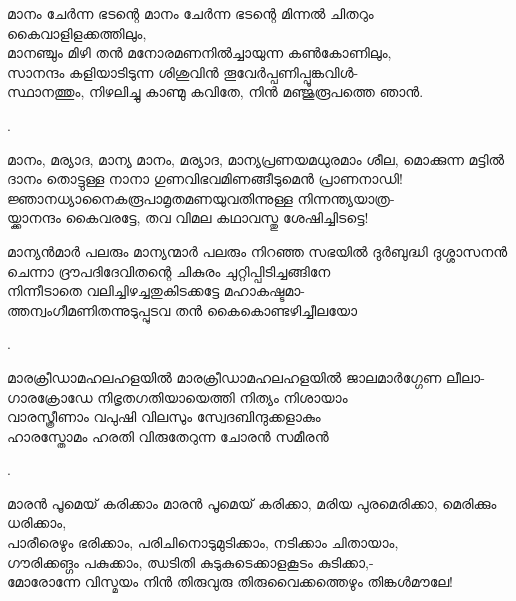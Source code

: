 \begin{enumerate}

\begin{slokam}{\VSv}{\VNM}{മാനം ചേർന്ന ഭടന്റെ}
മാനം ചേർന്ന ഭടന്റെ മിന്നൽ ചിതറും കൈവാളിളക്കത്തിലും,\\
മാനഞ്ചും മിഴി തൻ മനോരമണനിൽച്ചായുന്ന കൺകോണിലും,\\
സാനന്ദം കളിയാടിടുന്ന ശിശുവിൻ തൂവേർപ്പണിപ്പൂങ്കവിള്‍-\\
സ്ഥാനത്തും, നിഴലിച്ചു കാണ്മു കവിതേ, നിൻ മഞ്ജുരൂപത്തെ ഞാൻ.
\end{slokam}


.

\begin{slokam}{\VSr}{\VCBP}{മാനം, മര്യാദ, മാന്യ}
മാനം, മര്യാദ, മാന്യപ്രണയമധുരമാം ശീല, മൊക്കുന്ന മട്ടിൽ\\
ദാനം തൊട്ടുള്ള നാനാ ഗുണവിഭവമിണങ്ങീടുമെൻ പ്രാണനാഡി!\\
ജ്ഞാനധ്യാനൈകരൂപാമൃതമണയുവതിന്നുള്ള നിന്നന്ത്യയാത്ര-\\
യ്ക്കാനന്ദം കൈവരട്ടേ, തവ വിമല കഥാവസ്തു ശേഷിച്ചിടട്ടെ!
\end{slokam}



\begin{slokam}{\VSv}{\Naduv}{മാന്യൻമാർ പലരും}
മാന്യന്മാർ പലരും നിറഞ്ഞ സഭയിൽ ദുർബുദ്ധി ദുശ്ശാസനൻ\\
ചെന്നാ ദ്രൗപദിദേവിതന്റെ ചികുരം ചുറ്റിപ്പിടിച്ചങ്ങിനേ\\
നിന്നീടാതെ വലിച്ചിഴച്ചതുകിടക്കട്ടേ മഹാകഷ്ടമാ-\\
ത്തന്വംഗീമണിതന്നുടുപ്പുടവ തൻ കൈകൊണ്ടഴിച്ചീലയോ
\end{slokam}


.


\begin{slokam}{\VMk}{\KV}{മാരക്രീഡാമഹലഹളയിൽ}
മാരക്രീഡാമഹലഹളയിൽ ജാലമാർഗ്ഗേണ ലീലാ-\\
ഗാരക്രോഡേ നിഭൃതഗതിയായെത്തി നിത്യം നിശായാം\\
വാരസ്ത്രീണാം വപു‍ഷി വിലസും സ്വേദബിന്ദുക്കളാകും\\
ഹാരസ്തോമം ഹരതി വിരുതേറുന്ന ചോരൻ സമീരൻ
\end{slokam}


.


\begin{slokam}{\VSr}{\Unk}{മാരൻ പൂമെയ്‌ കരിക്കാം}
 മാരൻ പൂമെയ്‌ കരിക്കാ, മരിയ പുരമെരിക്കാ, മെരിക്കും ധരിക്കാം,\\
പാരീരെഴും ഭരിക്കാം, പരിചിനൊടുമുടിക്കാം, നടിക്കാം ചിതായാം,\\
ഗൗരിക്കങ്ഗം പകുക്കാം, ഝടിതി കുടുകുടെക്കാളകൂടം കുടിക്കാ,-\\
മോരോന്നേ വിസ്മയം നിൻ തിരുവുരു തിരുവൈക്കത്തെഴും തിങ്കള്‍മൗലേ!
\end{slokam}


\end{enumerate}
